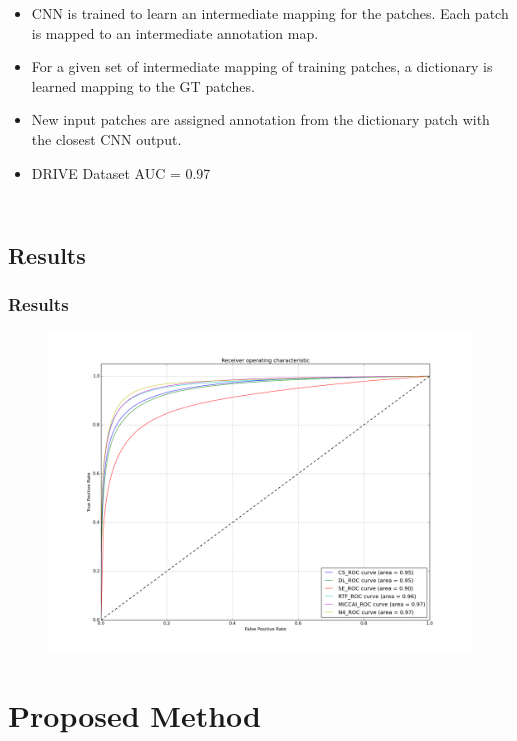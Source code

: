 \documentclass{beamer}
\begin{document}
\begin{frame}
\begin{columns}[c]
\begin{itemize}
\item CNN is trained to learn an intermediate mapping for the patches. Each patch is mapped to an intermediate annotation map.
\item For a given set of intermediate mapping of training patches, a dictionary is learned mapping to the GT patches.
\item New input patches are assigned annotation from the dictionary patch with the closest CNN output.
\item DRIVE Dataset AUC = 0.97 
\end{itemize}



\end{columns}

\end{frame}

\subsection{Results}
\begin{frame}
\frametitle{Results}

\begin{figure}
\includegraphics[width=0.8\linewidth]{Images/othermethods.png}
\end{figure}
\end{frame}


\section{Proposed Method}
\end{document}
